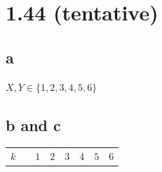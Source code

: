 \documentclass[
  letterpaper,
  DIV=11,
  numbers=noendperiod]{scrartcl}
\begin{document}
\section{1.44 (tentative)}\label{tentative}

\subsection{a}\label{a-1}

\(X,Y\in \{1,2,3,4,5,6\}\)

\subsection{b and c}\label{b-and-c}

\begin{longtable}[]{@{}
  >{\centering\arraybackslash}p{}
  >{\centering\arraybackslash}p{}
  >{\centering\arraybackslash}p{}
  >{\centering\arraybackslash}p{}
  >{\centering\arraybackslash}p{}
  >{\centering\arraybackslash}p{}
  >{\centering\arraybackslash}p{}
  >{\centering\arraybackslash}p{}@{}}
\toprule\noalign{}
\begin{minipage}[b]{\linewidth}\centering
\(k\)
\end{minipage} & \begin{minipage}[b]{\linewidth}\centering
\textbar{}
\end{minipage} & \begin{minipage}[b]{\linewidth}\centering
\(1\)
\end{minipage} & \begin{minipage}[b]{\linewidth}\centering
\(2\)
\end{minipage} & \begin{minipage}[b]{\linewidth}\centering
\(3\)
\end{minipage} & \begin{minipage}[b]{\linewidth}\centering
\(4\)
\end{minipage} & \begin{minipage}[b]{\linewidth}\centering
\(5\)
\end{minipage} & \begin{minipage}[b]{\linewidth}\centering
\(6\)
\end{minipage} \\

\end{longtable}
\end{document}
